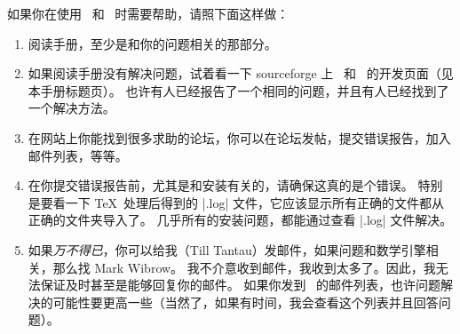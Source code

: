 \begin{onehalfspacing}

如果你在使用 \pgfname\ 和 \tikzname\ 时需要帮助，请照下面这样做：

\begin{enumerate}
\item
  阅读手册，至少是和你的问题相关的那部分。
\item
  如果阅读手册没有解决问题，试着看一下 sourceforge 上 \pgfname\ 和 \tikzname\ 的开发页面（见本手册标题页）。
  也许有人已经报告了一个相同的问题，并且有人已经找到了一个解决方法。
\item
  在网站上你能找到很多求助的论坛，你可以在论坛发帖，提交错误报告，加入邮件列表，等等。
\item
  在你提交错误报告前，尤其是和安装有关的，请确保这真的是个错误。
  特别是要看一下 \TeX\ 处理后得到的 |.log| 文件，它应该显示所有正确的文件都从正确的文件夹导入了。
  几乎所有的安装问题，都能通过查看 |.log| 文件解决。
\item
  如果\emph{万不得已}，你可以给我（Till Tantau）发邮件，如果问题和数学引擎相关，那么找 Mark Wibrow。
  我不介意收到邮件，我收到太多了。因此，我无法保证及时甚至是能够回复你的邮件。
  如果你发到 \pgfname\ 的邮件列表，也许问题解决的可能性要更高一些（当然了，如果有时间，我会查看这个列表并且回答问题）。
\end{enumerate}

\end{onehalfspacing}

